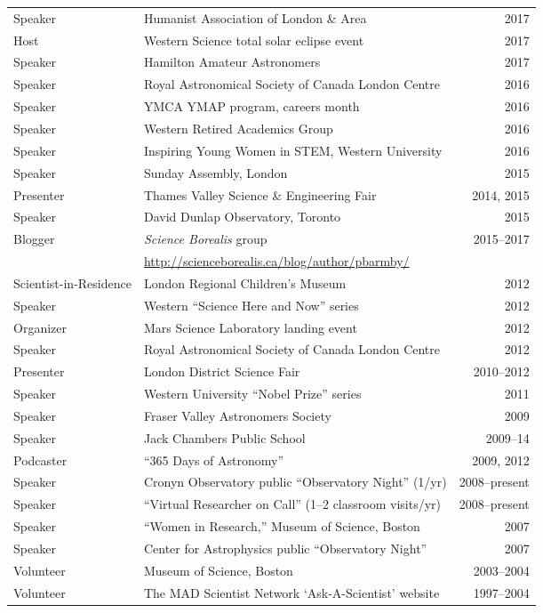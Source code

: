 \begin{tabularx}{\textwidth}{lXr}
Speaker & Humanist Association of London \& Area & 2017\\
Host & Western Science total solar eclipse event & 2017\\
Speaker & Hamilton Amateur Astronomers & 2017\\
Speaker& Royal Astronomical Society of Canada London Centre& 2016\\
Speaker & YMCA YMAP program, careers month & 2016\\
Speaker& Western Retired Academics Group& 2016\\
Speaker &  Inspiring Young Women in STEM, Western University & 2016\\
Speaker & Sunday Assembly, London  & 2015\\
Presenter& Thames Valley Science \& Engineering Fair& 2014, 2015\\
Speaker & David Dunlap Observatory, Toronto& 2015\\
Blogger & {\it Science Borealis} group& 2015--2017\\
&  \url{http://scienceborealis.ca/blog/author/pbarmby/}  & \\
Scientist-in-Residence& London Regional Children's Museum& 2012\\
Speaker& Western ``Science Here and Now'' series& 2012\\
Organizer& Mars Science Laboratory landing event& 2012\\
Speaker& Royal Astronomical Society of Canada London Centre& 2012\\
Presenter& London District Science Fair& 2010--2012\\
Speaker& Western University ``Nobel Prize'' series& 2011\\
Speaker& Fraser Valley Astronomers Society& 2009\\
Speaker& Jack Chambers Public School& 2009--14\\
Podcaster &  ``365 Days of Astronomy''  &2009, 2012\\
Speaker& Cronyn Observatory public ``Observatory Night'' (1/yr)& 2008--present\\
Speaker& ``Virtual Researcher on Call''  (1--2 classroom visits/yr) & 2008--present\\
Speaker & ``Women in Research,''  Museum of Science, Boston& 2007\\
Speaker& Center for Astrophysics public ``Observatory Night'' & 2007\\
Volunteer& Museum of Science, Boston& 2003--2004\\
Volunteer& The MAD Scientist Network `Ask-A-Scientist' website& 1997--2004\\
\end{tabularx}
